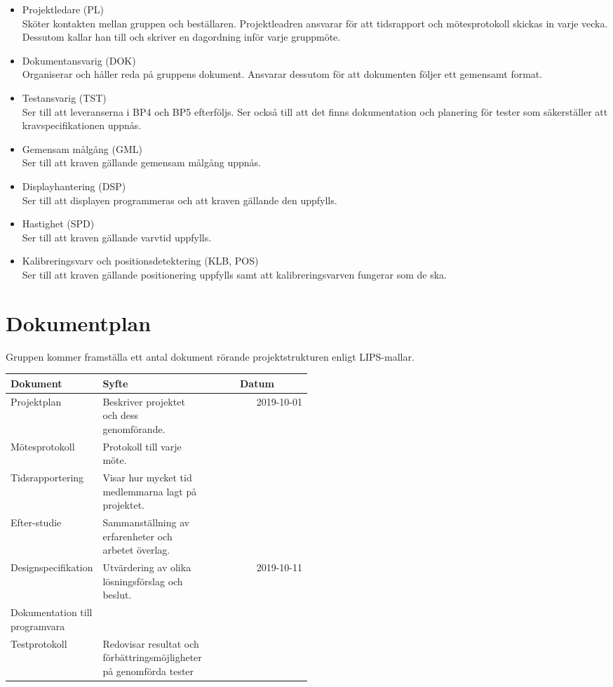 \documentclass[10pt,swedish,oneside]{lips-no_customer}
\begin{document}
		\begin{itemize}
			\item Projektledare (PL) \\ Sköter kontakten mellan gruppen och beställaren. Projektleadren ansvarar för att tidsrapport och mötesprotokoll skickas in varje vecka. Dessutom kallar han till och skriver en dagordning inför varje gruppmöte.
			\item Dokumentansvarig (DOK) \\ Organiserar och håller reda på gruppens dokument. Ansvarar dessutom för att dokumenten följer ett gemensamt format.
			\item Testansvarig (TST) \\ Ser till att leveranserna i BP4 och BP5 efterföljs. Ser också till att det finns dokumentation och planering för tester som säkerställer att kravspecifikationen uppnås.
			\item Gemensam målgång (GML) \\ Ser till att kraven gällande gemensam målgång uppnås.
			\item Displayhantering (DSP) \\ Ser till att displayen programmeras och att kraven gällande den uppfylls.
			\item Hastighet (SPD) \\ Ser till att kraven gällande varvtid uppfylls.
			\item Kalibreringsvarv och positionsdetektering (KLB, POS) \\ Ser till att kraven gällande positionering uppfylls samt att kalibreringsvarven fungerar som de ska.
		\end{itemize}
	\section{Dokumentplan}
		Gruppen kommer framställa ett antal dokument rörande projektstrukturen enligt LIPS-mallar.
		
		\begin{tabular}{| p{0.25\linewidth} | p{0.25\linewidth } | r |}
			\multicolumn{1}{l}{\textbf{Dokument}} & \multicolumn{1}{l}{\textbf{Syfte}} & \multicolumn{1}{c}{\textbf{Datum}} \\\hline
			Projektplan & Beskriver projektet och dess genomförande. & 2019-10-01 \\\hline
			Mötesprotokoll & Protokoll till varje möte. & \\\hline
			Tidsrapportering & Visar hur mycket tid medlemmarna lagt på projektet. & \\\hline
			Efter-studie & Sammanställning av erfarenheter och arbetet överlag. & \\\hline
			Designspecifikation & Utvärdering av olika lösningsförslag och beslut. & 2019-10-11 \\\hline
			Dokumentation till programvara && \\\hline
			Testprotokoll & Redovisar resultat och förbättringsmöjligheter på genomförda tester & \\\hline
		\end{tabular}
	
\end{document}
